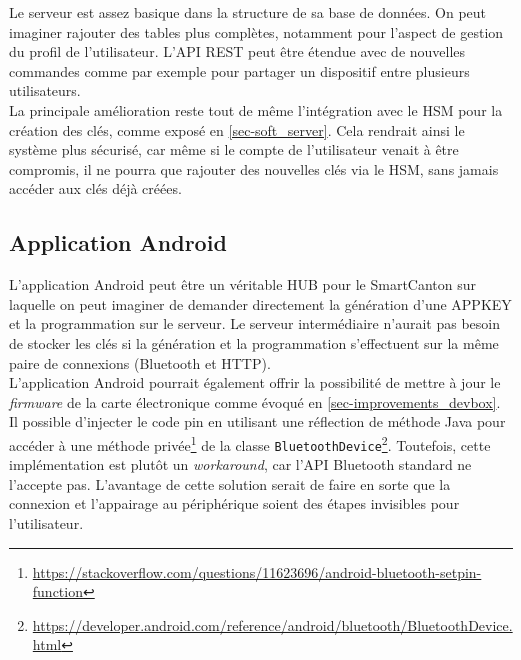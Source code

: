 Le serveur est assez basique dans la structure de sa base de données. On peut imaginer rajouter des tables plus complètes, notamment pour l'aspect de gestion du profil de l'utilisateur. L'API REST peut être étendue avec de nouvelles commandes comme par exemple pour partager un dispositif entre plusieurs utilisateurs. \\

La principale amélioration reste tout de même l'intégration avec le HSM pour la création des clés, comme exposé en \cref{sec-soft_server}. Cela rendrait ainsi le système plus sécurisé, car même si le compte de l'utilisateur venait à être compromis, il ne pourra que rajouter des nouvelles clés via le HSM, sans jamais accéder aux clés déjà créées.



\subsection{Application Android}
L'application Android peut être un véritable HUB pour le SmartCanton sur laquelle on peut imaginer de demander directement la génération d'une APPKEY et la programmation sur le serveur. Le serveur intermédiaire n'aurait pas besoin de stocker les clés si la génération et la programmation s'effectuent sur la même paire de connexions (Bluetooth et HTTP). \\


L'application Android pourrait également offrir la possibilité de mettre à jour le \textit{firmware} de la carte électronique comme évoqué en \cref{sec-improvements_devbox}. \\

Il possible d'injecter le code pin en utilisant une réflection de méthode Java pour accéder à une méthode privée\footnote{\url{https://stackoverflow.com/questions/11623696/android-bluetooth-setpin-function}} de la classe \texttt{BluetoothDevice}\footnote{\url{https://developer.android.com/reference/android/bluetooth/BluetoothDevice.html}}. Toutefois, cette implémentation est plutôt un \textit{workaround}, car l'API Bluetooth standard ne l'accepte pas. L'avantage de cette solution serait de faire en sorte que la connexion et l'appairage au périphérique soient des étapes invisibles pour l'utilisateur.



